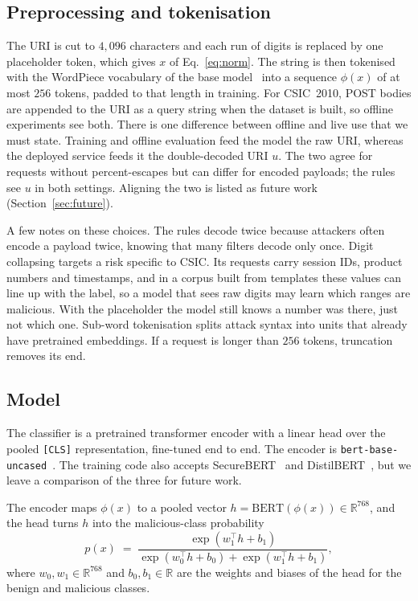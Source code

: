 \documentclass[preprint,11pt]{elsarticle}
\begin{document}
\subsection{Preprocessing and tokenisation}
The URI is cut to $4{,}096$ characters and each run of digits is replaced
by one placeholder token, which gives $x$ of Eq.~\eqref{eq:norm}. The
string is then tokenised with the WordPiece vocabulary of the base
model~\cite{wu2016gnmt} into a sequence $\phi(x)$ of at most $256$ tokens,
padded to that length in training. For CSIC~2010, POST bodies are appended
to the URI as a query string when the dataset is built, so offline
experiments see both. There is one difference between offline and live use
that we must state. Training and offline evaluation feed the model the raw
URI, whereas the deployed service feeds it the double-decoded URI $u$. The
two agree for requests without percent-escapes but can differ for encoded
payloads; the rules see $u$ in both settings. Aligning the two is listed as
future work (Section~\ref{sec:future}).

A few notes on these choices. The rules decode twice because attackers
often encode a payload twice, knowing that many filters decode only once.
Digit collapsing targets a risk specific to CSIC. Its requests carry
session IDs, product numbers and timestamps, and in a corpus built from
templates these values can line up with the label, so a model that sees raw
digits may learn which ranges are malicious. With the placeholder the model
still knows a number was there, just not which one. Sub-word tokenisation
splits attack syntax into units that already have pretrained embeddings.
If a request is longer than $256$ tokens, truncation removes its end.

\subsection{Model}
The classifier is a pretrained transformer encoder with a linear head over
the pooled \texttt{[CLS]} representation, fine-tuned end to end. The
encoder is \texttt{bert-base-uncased}~\cite{devlin2019bert}. The training
code also accepts SecureBERT~\cite{aghaei2022securebert,aghaei2025securebert2}
and DistilBERT~\cite{sanh2019distilbert}, but we leave a comparison of the
three for future work.

The encoder maps $\phi(x)$ to a pooled vector
$h=\mathrm{BERT}(\phi(x))\in\mathbb{R}^{768}$, and the head turns $h$ into
the malicious-class probability
\begin{equation}
p(x) \;=\; \frac{\exp(w_1^\top h + b_1)}{\exp(w_0^\top h + b_0) + \exp(w_1^\top h + b_1)},
\label{eq:softmax}
\end{equation}
where $w_0,w_1\in\mathbb{R}^{768}$ and $b_0,b_1\in\mathbb{R}$ are the
weights and biases of the head for the benign and malicious classes.
\end{document}
